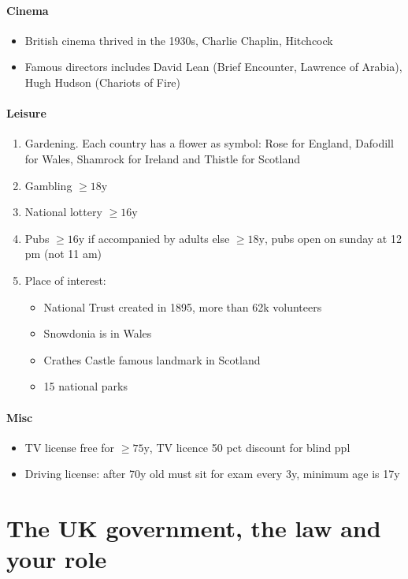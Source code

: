\documentclass{amsart}
\begin{document}
\paragraph{Cinema}
\begin{itemize}
	\item British cinema thrived in the 1930s, Charlie Chaplin, Hitchcock
	\item Famous directors includes David Lean (Brief Encounter, Lawrence of Arabia), Hugh Hudson (Chariots of Fire)
\end{itemize}

\paragraph{Leisure}
\begin{enumerate}
	\item Gardening. Each country has a flower as symbol: Rose for England, Dafodill for Wales, Shamrock for Ireland and Thistle for Scotland
	\item Gambling $\geq 18\textrm{y}$
	\item National lottery $\geq 16\textrm{y}$
	\item Pubs $\geq 16\textrm{y}$ if accompanied by adults else $\geq 18\textrm{y}$, pubs open on sunday at 12 pm (not 11 am)
	\item Place of interest: 
			\begin{itemize}
				\item National Trust created in 1895, more than 62k volunteers
				\item Snowdonia is in Wales
				\item Crathes Castle famous landmark in Scotland
				\item 15 national parks
			\end{itemize}
\end{enumerate}

\paragraph{Misc}
\begin{itemize}
	\item TV license free for $\geq 75\textrm{y}$, TV licence 50 pct discount for blind ppl
	\item Driving license: after 70y old must sit for exam every 3y,  minimum age is 17y
\end{itemize}

\section{The UK government, the law and your role}
\end{document}
